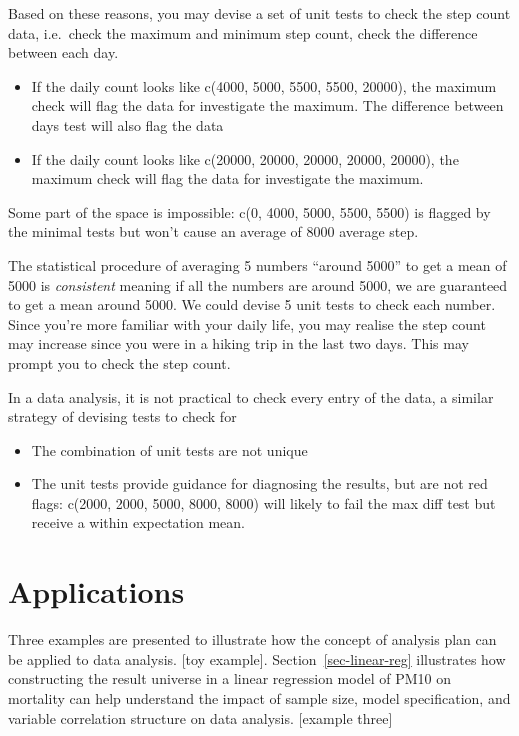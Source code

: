 \documentclass[
]{jds}
\providecommand{\tightlist}{%
  \setlength{\itemsep}{0pt}\setlength{\parskip}{0pt}}\usepackage{longtable,booktabs,array}
\begin{document}
Based on these reasons, you may devise a set of unit tests to check the
step count data, i.e.~check the maximum and minimum step count, check
the difference between each day.

\begin{itemize}
\tightlist
\item
  If the daily count looks like c(4000, 5000, 5500, 5500, 20000), the
  maximum check will flag the data for investigate the maximum. The
  difference between days test will also flag the data
\item
  If the daily count looks like c(20000, 20000, 20000, 20000, 20000),
  the maximum check will flag the data for investigate the maximum.
\end{itemize}

Some part of the space is impossible: c(0, 4000, 5000, 5500, 5500) is
flagged by the minimal tests but won't cause an average of 8000 average
step.

The statistical procedure of averaging 5 numbers ``around 5000'' to get
a mean of 5000 is \emph{consistent} meaning if all the numbers are
around 5000, we are guaranteed to get a mean around 5000. We could
devise 5 unit tests to check each number. Since you're more familiar
with your daily life, you may realise the step count may increase since
you were in a hiking trip in the last two days. This may prompt you to
check the step count.

In a data analysis, it is not practical to check every entry of the
data, a similar strategy of devising tests to check for

\begin{itemize}
\tightlist
\item
  The combination of unit tests are not unique
\item
  The unit tests provide guidance for diagnosing the results, but are
  not red flags: c(2000, 2000, 5000, 8000, 8000) will likely to fail the
  max diff test but receive a within expectation mean.
\end{itemize}

\section{Applications}\label{sec-examples}

Three examples are presented to illustrate how the concept of analysis
plan can be applied to data analysis. {[}toy example{]}.
Section~\ref{sec-linear-reg} illustrates how constructing the result
universe in a linear regression model of PM10 on mortality can help
understand the impact of sample size, model specification, and variable
correlation structure on data analysis. {[}example three{]}
\end{document}
